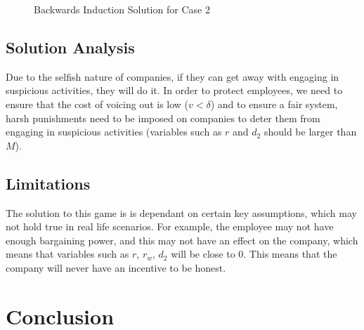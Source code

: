 \documentclass[a4paper, 12pt]{article}
\begin{document}
\begin{figure}[H]
\begin{center}
\end{center}
\caption{Backwards Induction Solution for Case 2}
\end{figure}


\subsection{Solution Analysis}
Due to the selfish nature of companies, if they can get away with engaging in suspicious activities, they will do it. In order to protect employees, we need to ensure that the cost of voicing out is low ($v < \delta$) and to ensure a fair system, harsh punishments need to be imposed on companies to deter them from engaging in suspicious activities (variables such as $r$ and $d_2$ should be larger than $M$).

\subsection{Limitations}
The solution to this game is is dependant on certain key assumptions, which may not hold true in real life scenarios. For example, the employee may not have enough bargaining power, and this may not have an effect on the company, which means that variables such as $r$, $r_w$, $d_2$ will be close to 0. This means that the company will never have an incentive to be honest.


\section{Conclusion}
\end{document}
